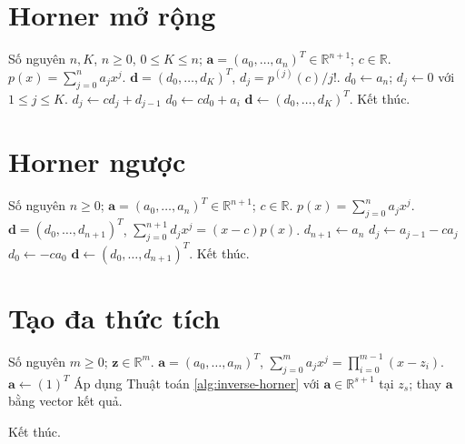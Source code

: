 \documentclass[12pt,a4paper,oneside]{book}
\numberwithin{algorithm}{chapter}
\theoremstyle{definition}
\newcommand{\R}{\mathbb{R}}
\begin{document}
\section{Horner mở rộng}
\begin{algorithm}[H]
\caption{Tính đạo hàm bằng Horner mở rộng}
\label{alg:horner-jet}
\begin{algorithmic}[1]
\Require Số nguyên $n,K$, $n\geq0$, $0\leq K\leq n$; $\boldsymbol a=(a_0,\ldots,a_n)^T\in\R^{n+1}$; $c\in\R$. $p(x)=\sum_{j=0}^{n}a_jx^j$.
\Ensure $\boldsymbol d=(d_0,\ldots,d_K)^T$, $d_j=p^{(j)}(c)/j!$.
\State $d_0\gets a_n$; $d_j\gets0$ với $1\leq j\leq K$.
    \State $d_j\gets cd_j+d_{j-1}$
  \EndFor
\Statex
  \State $d_0\gets cd_0+a_i$
\EndFor
\Statex
\State $\boldsymbol d\gets(d_0,\ldots,d_K)^T$.
\State Kết thúc.
\end{algorithmic}
\end{algorithm}

\section{Horner ngược}
\begin{algorithm}[H]
\caption{Nhân với nhân tử tuyến tính bằng Horner ngược}
\label{alg:inverse-horner}
\begin{algorithmic}[1]
\Require Số nguyên $n\geq0$; $\boldsymbol a=(a_0,\ldots,a_n)^T\in\R^{n+1}$; $c\in\R$. $p(x)=\sum_{j=0}^{n}a_jx^j$.
\Ensure $\boldsymbol d=(d_0,\ldots,d_{n+1})^T$, $\sum_{j=0}^{n+1}d_jx^j=(x-c)p(x)$.
\State $d_{n+1}\gets a_n$
  \State $d_j\gets a_{j-1}-ca_j$
\EndFor
\Statex
\State $d_0\gets-ca_0$
\State $\boldsymbol d\gets(d_0,\ldots,d_{n+1})^T$.
\State Kết thúc.
\end{algorithmic}
\end{algorithm}

\section{Tạo đa thức tích}
\begin{algorithm}[H]
\caption{Tạo đa thức tích bằng Horner ngược -- sơ lược}
\label{alg:horner-product}
\begin{algorithmic}[1]
\Require Số nguyên $m\geq0$; $\boldsymbol z\in\R^m$.
\Ensure $\boldsymbol a=(a_0,\ldots,a_m)^T$, $\sum_{j=0}^{m}a_jx^j=\prod_{i=0}^{m-1}(x-z_i)$.
\State $\boldsymbol a\gets(1)^T$
  \State Áp dụng Thuật toán \ref{alg:inverse-horner} với $\boldsymbol a\in\R^{s+1}$ tại $z_s$; thay $\boldsymbol a$ bằng vector kết quả.
\EndFor
\Statex

\State Kết thúc.
\end{algorithmic}
\end{algorithm}
\end{document}
